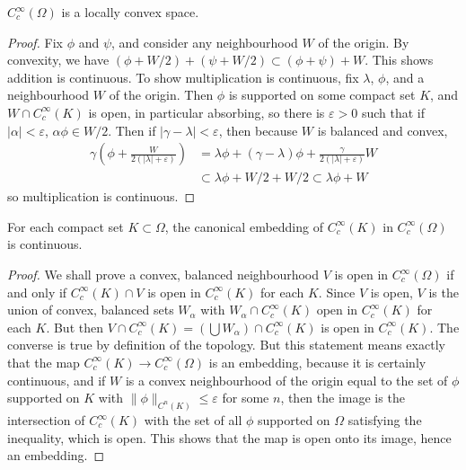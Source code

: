 \begin{theorem}
    $C_c^\infty(\Omega)$ is a locally convex space.
\end{theorem}
\begin{proof}
    Fix $\phi$ and $\psi$, and consider any neighbourhood $W$ of the origin. By convexity, we have $(\phi + W/2) + (\psi + W/2) \subset (\phi + \psi) + W$. This shows addition is continuous. To show multiplication is continuous, fix $\lambda$, $\phi$, and a neighbourhood $W$ of the origin. Then $\phi$ is supported on some compact set $K$, and $W \cap C_c^\infty(K)$ is open, in particular absorbing, so there is $\varepsilon > 0$ such that if $|\alpha| < \varepsilon$, $\alpha \phi \in W/2$. Then if $|\gamma - \lambda| < \varepsilon$, then because $W$ is balanced and convex,
    \begin{align*}
        \gamma \left(\phi + \frac{W}{2(|\lambda| + \varepsilon)} \right) &= \lambda \phi + (\gamma - \lambda) \phi + \frac{\gamma}{2(|\lambda| + \varepsilon)} W\\
        &\subset \lambda \phi + W/2 + W/2 \subset \lambda \phi + W
    \end{align*}
    so multiplication is continuous.
\end{proof}

\begin{theorem}
    For each compact set $K \subset \Omega$, the canonical embedding of $C_c^\infty(K)$ in $C_c^\infty(\Omega)$ is continuous.
\end{theorem}
\begin{proof}
    We shall prove a convex, balanced neighbourhood $V$ is open in $C_c^\infty(\Omega)$ if and only if $C_c^\infty(K) \cap V$ is open in $C_c^\infty(K)$ for each $K$. Since $V$ is open, $V$ is the union of convex, balanced sets $W_\alpha$ with $W_\alpha \cap C_c^\infty(K)$ open in $C_c^\infty(K)$ for each $K$. But then $V \cap C_c^\infty(K) = (\bigcup W_\alpha) \cap C_c^\infty(K)$ is open in $C_c^\infty(K)$. The converse is true by definition of the topology. But this statement means exactly that the map $C_c^\infty(K) \to C_c^\infty(\Omega)$ is an embedding, because it is certainly continuous, and if $W$ is a convex neighbourhood of the origin equal to the set of $\phi$ supported on $K$ with $\| \phi \|_{C^n(K)} \leq \varepsilon$ for some $n$, then the image is the intersection of $C_c^\infty(K)$ with the set of all $\phi$ supported on $\Omega$ satisfying the inequality, which is open. This shows that the map is open onto its image, hence an embedding.
\end{proof}

